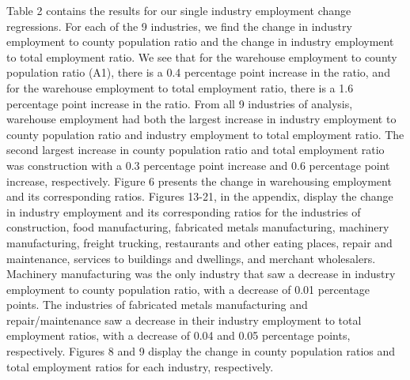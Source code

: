 \documentclass[11pt]{article}
\begin{document}
\-\hspace{0.5cm} Table 2 contains the results for our single industry employment change regressions. For each of the 9 industries, we find the change in industry employment to county population ratio and the change in industry employment to total employment ratio. We see that for the warehouse employment to county population ratio (A1), there is a 0.4 percentage point increase in the ratio, and for the warehouse employment to total employment ratio, there is a 1.6 percentage point increase in the ratio. From all 9 industries of analysis, warehouse employment had both the largest increase in industry employment to county population ratio and industry employment to total employment ratio. The second largest increase in county population ratio and total employment ratio was construction with a 0.3 percentage point increase and 0.6 percentage point increase, respectively. Figure 6 presents the change in warehousing employment and its corresponding ratios. Figures 13-21, in the appendix, display the change in industry employment and its corresponding ratios for the industries of construction, food manufacturing, fabricated metals manufacturing, machinery manufacturing, freight trucking, restaurants and other eating places, repair and maintenance, services to buildings and dwellings, and merchant wholesalers. Machinery manufacturing was the only industry that saw a decrease in industry employment to county population ratio, with a decrease of 0.01 percentage points. The industries of fabricated metals manufacturing and repair/maintenance saw a decrease in their industry employment to total employment ratios, with a decrease of 0.04 and 0.05 percentage points, respectively.  Figures 8 and 9 display the change in county population ratios and total employment ratios for each industry, respectively.  
\end{document}
